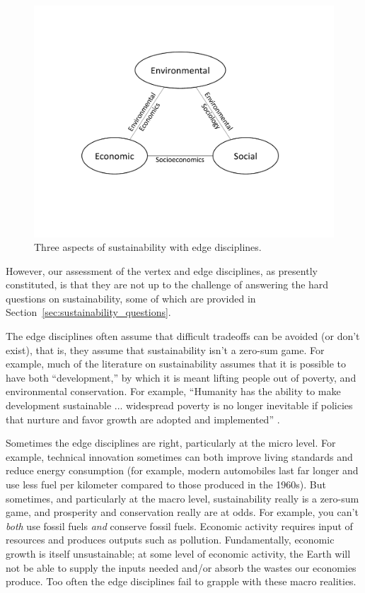 \documentclass[12pt]{article}
\begin{document}
\begin{figure}
\centering
\includegraphics[width=0.75\linewidth]{figure_other/TriangleDiagramWithDisciplines.pdf}
\caption{Three aspects of sustainability with edge disciplines.}
\label{fig:3_sustain_with_edge_disciplines}
\end{figure}

However, our assessment of the vertex and edge disciplines,
as presently constituted,
is that they are not up to the challenge of answering the hard questions on sustainability,
some of which are provided in Section~\ref{sec:sustainability_questions}.

The edge disciplines often assume that difficult tradeoffs can be avoided (or don't exist), 
that is, they assume that sustainability isn't a zero-sum game. 
For example, 
much of the literature on sustainability 
assumes that it is possible to have both ``development,'' 
by which it is meant lifting people out of poverty,
and environmental conservation. 
For example, ``Humanity has the ability to make development sustainable ... widespread poverty is no
longer inevitable if policies that nurture and favor growth are adopted and implemented''
\autocite{Ngome2015}.

Sometimes the edge disciplines are right, particularly at the micro level.
For example, technical innovation sometimes can both 
improve living standards and reduce energy consumption
(for example, modern automobiles last far longer and use less fuel
per kilometer compared to those produced in the 1960s).
But sometimes, and particularly at the macro level,
sustainability really is a zero-sum game, and 
prosperity and conservation really are at odds.
For example, you can't \emph{both} use fossil fuels \emph{and} conserve fossil fuels.
Economic activity requires input of resources
and produces outputs such as pollution. 
Fundamentally, economic growth is itself unsustainable; 
at some level of economic activity,
the Earth will not be able to supply the inputs needed and/or 
absorb the wastes our economies produce.
Too often the edge disciplines fail to grapple with these macro realities.
\end{document}
